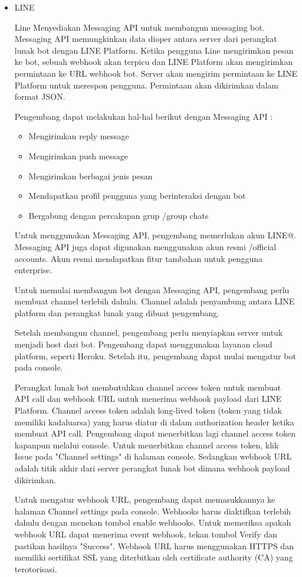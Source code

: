 \documentclass[a4paper,twoside]{article}
\begin{document}
\begin{enumerate}
\begin{itemize}
		\item LINE
		
		Line Menyediakan Messaging API untuk membangun messaging bot. Messaging API memungkinkan data dioper antara server dari perangkat lunak bot dengan LINE Platform. Ketika pengguna Line mengirimkan pesan ke bot, sebuah webhook akan terpicu dan LINE Platform akan mengirimkan permintaan ke URL webhook bot. Server akan mengirim permintaan ke LINE Platform untuk merespon pengguna. Permintaan akan dikirimkan dalam format JSON.
		
		Pengembang dapat melakukan hal-hal berikut dengan Messaging API :
		\begin{itemize}
		\item Mengirimkan reply message
		\item Mengirimkan push message
		\item Mengirimkan berbagai jenis pesan
		\item Mendapatkan profil pengguna yang berinteraksi dengan bot
		\item Bergabung dengan percakapan grup /group chats
		\end{itemize}

		Untuk menggunakan Messaging API, pengembang memerlukan akun LINE@. Messaging API juga dapat digunakan menggunakan akun resmi /official accounts. Akun resmi mendapatkan fitur tambahan untuk pengguna enterprise.
		
		Untuk memulai membangun bot dengan Messaging API, pengembang perlu membuat channel terlebih dahulu. Channel adalah penyambung antara LINE platform dan perangkat lunak yang dibuat pengembang.
		
		Setelah membangun channel, pengembang perlu menyiapkan server untuk menjadi host dari bot. Pengembang dapat menggunakan layanan cloud platform, seperti Heroku. Setelah itu, pengembang dapat mulai mengatur bot pada console.

		Perangkat lunak bot membutuhkan channel access token untuk membuat API call dan webhook URL untuk menerima webhook payload dari LINE Platform. Channel access token adalah long-lived token (token yang tidak memiliki kadaluarsa) yang harus diatur di dalam authorization header ketika membuat API call. Pengembang dapat menerbitkan lagi channel access token kapanpun melalui console. Untuk menerbitkan channel access token, klik Issue pada "Channel settings" di halaman console. Sedangkan webhook URL adalah titik akhir dari server perangkat lunak bot dimana webhook payload dikirimkan.

		Untuk mengatur webhook URL, pengembang dapat memasukkannya ke halaman Channel settings pada console. Webhooks harus diaktifkan terlebih dahulu dengan menekan tombol enable webhooks. Untuk memeriksa apakah webhook URL dapat menerima event webhook, tekan tombol Verify dan pastikan hasilnya "Success". Webhook URL harus menggunakan HTTPS dan memiliki sertifikat SSL yang diterbitkan oleh certificate authority (CA) yang terotorisasi.
		

\end{itemize}
\end{enumerate}
\end{document}
